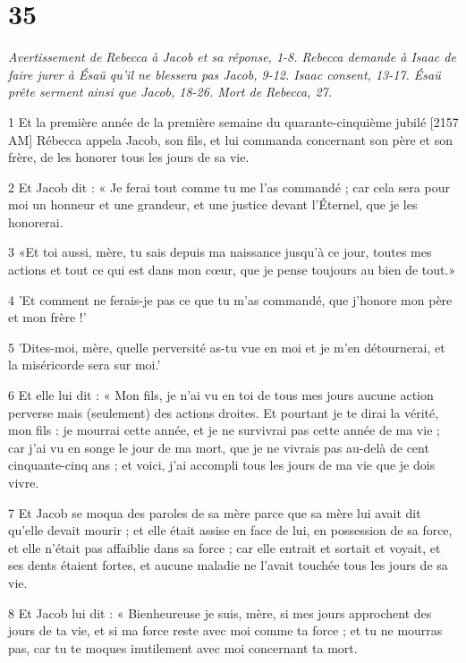 \chapter{35}

\par \textit{Avertissement de Rebecca à Jacob et sa réponse, 1-8. Rebecca demande à Isaac de faire jurer à Ésaü qu'il ne blessera pas Jacob, 9-12. Isaac consent, 13-17. Ésaü prête serment ainsi que Jacob, 18-26. Mort de Rebecca, 27.}

\par 1 Et la première année de la première semaine du quarante-cinquième jubilé [2157 AM] Rébecca appela Jacob, son fils, et lui commanda concernant son père et son frère, de les honorer tous les jours de sa vie.
\par 2 Et Jacob dit : « Je ferai tout comme tu me l'as commandé ; car cela sera pour moi un honneur et une grandeur, et une justice devant l'Éternel, que je les honorerai.
\par 3 «Et toi aussi, mère, tu sais depuis ma naissance jusqu'à ce jour, toutes mes actions et tout ce qui est dans mon cœur, que je pense toujours au bien de tout.»
\par 4 'Et comment ne ferais-je pas ce que tu m'as commandé, que j'honore mon père et mon frère !'
\par 5 'Dites-moi, mère, quelle perversité as-tu vue en moi et je m'en détournerai, et la miséricorde sera sur moi.'
\par 6 Et elle lui dit : « Mon fils, je n'ai vu en toi de tous mes jours aucune action perverse mais (seulement) des actions droites. Et pourtant je te dirai la vérité, mon fils : je mourrai cette année, et je ne survivrai pas cette année de ma vie ; car j'ai vu en songe le jour de ma mort, que je ne vivrais pas au-delà de cent cinquante-cinq ans ; et voici, j'ai accompli tous les jours de ma vie que je dois vivre.
\par 7 Et Jacob se moqua des paroles de sa mère parce que sa mère lui avait dit qu'elle devait mourir ; et elle était assise en face de lui, en possession de sa force, et elle n'était pas affaiblie dans sa force ; car elle entrait et sortait et voyait, et ses dents étaient fortes, et aucune maladie ne l'avait touchée tous les jours de sa vie.
\par 8 Et Jacob lui dit : « Bienheureuse je suis, mère, si mes jours approchent des jours de ta vie, et si ma force reste avec moi comme ta force ; et tu ne mourras pas, car tu te moques inutilement avec moi concernant ta mort.
